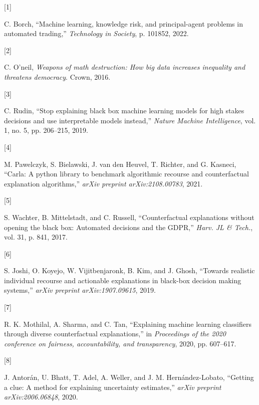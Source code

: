 \documentclass[
  conference]{IEEEtran}
\newlength{\cslhangindent}
\newlength{\csllabelwidth}
\newlength{\cslentryspacingunit} %
\newenvironment{CSLReferences}[2] %
 {%
  \setlength{\parindent}{0pt}
  \ifodd #1
  \let\oldpar\par
  \def\par{\hangindent=\cslhangindent\oldpar}
  \fi
  \setlength{\parskip}{#2\cslentryspacingunit}
 }%
 {}
\newcommand{\CSLLeftMargin}[1]{\parbox[t]{\csllabelwidth}{#1}}
\newcommand{\CSLRightInline}[1]{\parbox[t]{\linewidth - \csllabelwidth}{#1}\break}
\begin{document}
\hypertarget{refs}{}
\begin{CSLReferences}{0}{0}
\leavevmode{}%
\CSLLeftMargin{{[}1{]} }%
\CSLRightInline{C. Borch, {``Machine learning, knowledge risk, and
principal-agent problems in automated trading,''} \emph{Technology in
Society}, p. 101852, 2022.}

\leavevmode{}%
\CSLLeftMargin{{[}2{]} }%
\CSLRightInline{C. O'neil, \emph{Weapons of math destruction: How big
data increases inequality and threatens democracy}. Crown, 2016.}

\leavevmode{}%
\CSLLeftMargin{{[}3{]} }%
\CSLRightInline{C. Rudin, {``Stop explaining black box machine learning
models for high stakes decisions and use interpretable models
instead,''} \emph{Nature Machine Intelligence}, vol. 1, no. 5, pp.
206--215, 2019.}

\leavevmode{}%
\CSLLeftMargin{{[}4{]} }%
\CSLRightInline{M. Pawelczyk, S. Bielawski, J. van den Heuvel, T.
Richter, and G. Kasneci, {``Carla: A python library to benchmark
algorithmic recourse and counterfactual explanation algorithms,''}
\emph{arXiv preprint arXiv:2108.00783}, 2021.}

\leavevmode{}%
\CSLLeftMargin{{[}5{]} }%
\CSLRightInline{S. Wachter, B. Mittelstadt, and C. Russell,
{``Counterfactual explanations without opening the black box: Automated
decisions and the GDPR,''} \emph{Harv. JL \& Tech.}, vol. 31, p. 841,
2017.}

\leavevmode{}%
\CSLLeftMargin{{[}6{]} }%
\CSLRightInline{S. Joshi, O. Koyejo, W. Vijitbenjaronk, B. Kim, and J.
Ghosh, {``Towards realistic individual recourse and actionable
explanations in black-box decision making systems,''} \emph{arXiv
preprint arXiv:1907.09615}, 2019.}

\leavevmode{}%
\CSLLeftMargin{{[}7{]} }%
\CSLRightInline{R. K. Mothilal, A. Sharma, and C. Tan, {``Explaining
machine learning classifiers through diverse counterfactual
explanations,''} in \emph{Proceedings of the 2020 conference on
fairness, accountability, and transparency}, 2020, pp. 607--617.}

\leavevmode{}%
\CSLLeftMargin{{[}8{]} }%
\CSLRightInline{J. Antorán, U. Bhatt, T. Adel, A. Weller, and J. M.
Hernández-Lobato, {``Getting a clue: A method for explaining uncertainty
estimates,''} \emph{arXiv preprint arXiv:2006.06848}, 2020.}


\end{CSLReferences}
\end{document}
